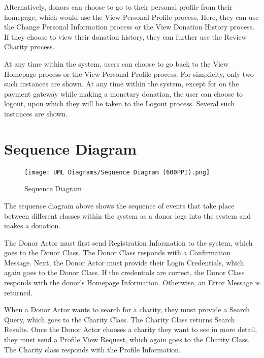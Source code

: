 \documentclass{scrreprt}
\begin{document}
    Alternatively, donors can choose to go to their personal profile from their homepage, which would use the View Personal Profile process. Here, they can use the Change Personal Information process or the View Donation History process. If they choose to view their donation history, they can further use the Review Charity process.\par
    
    At any time within the system, users can choose to go back to the View Homepage process or the View Personal Profile process. For simplicity, only two such instances are shown. At any time within the system, except for on the payment gateway while making a monetary donation, the user can choose to logout, upon which they will be taken to the Logout process. Several such instances are shown.
    
    \section{Sequence Diagram}
        \begin{figure}[H]
            \centering
            \texttt{[image: UML Diagrams/Sequence Diagram (600PPI).png]}
            {\caption*{Sequence Diagram}}
        \end{figure}
    
    The sequence diagram above shows the sequence of events that take place between different classes within the system as a donor logs into the system and makes a donation.\par
    
    The Donor Actor must first send Registration Information to the system, which goes to the Donor Class. The Donor Class responds with a Confirmation Message. Next, the Donor Actor must provide their Login Credentials, which again goes to the Donor Class. If the credentials are correct, the Donor Class responds with the donor's Homepage Information. Otherwise, an Error Message is returned.\par
    
    When a Donor Actor wants to search for a charity, they must provide a Search Query, which goes to the Charity Class. The Charity Class returns Search Results. Once the Donor Actor chooses a charity they want to see in more detail, they must send a Profile View Request, which again goes to the Charity Class. The Charity class responds with the Profile Information.\par
    
\end{document}
